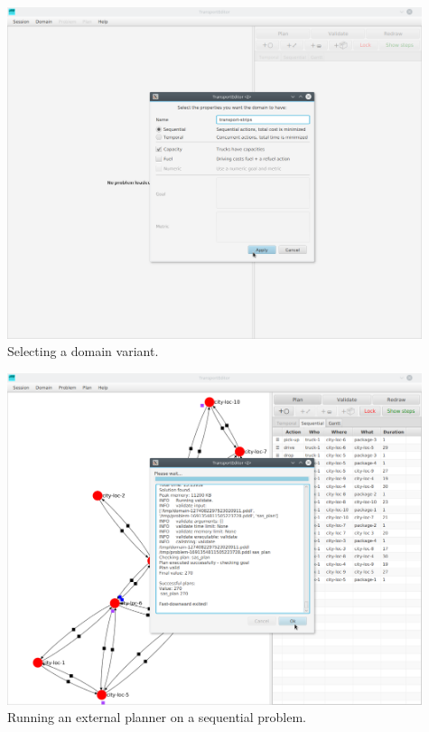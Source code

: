 \begin{center}
\includegraphics[width=0.91\textwidth]{../img/transporteditor_dom-creat}
Selecting a domain variant.
\end{center}
\medskip

\begin{center}
\includegraphics[width=0.91\textwidth]{../img/transporteditor_planning}
Running an external planner on a sequential problem.
\end{center}
\medskip


